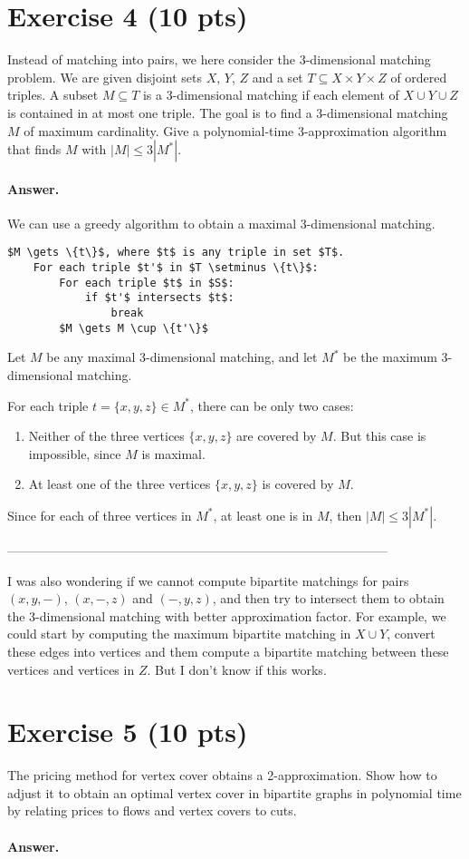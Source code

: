 \documentclass[a4paper]{article}
\begin{document}
\section*{Exercise 4 (10 pts)}

Instead of matching into pairs, we here consider the 3-dimensional matching problem. We are given disjoint sets $X$, $Y$, $Z$ and a set $T \subseteq X \times Y \times Z$ of ordered triples. A subset $M \subseteq T$ is a 3-dimensional matching if each element of $X \cup Y \cup Z$ is contained in at most one triple. The goal is to find a 3-dimensional matching $M$ of maximum cardinality. Give a polynomial-time 3-approximation algorithm that finds $M$ with $|M| \le 3|M^\ast|$.

\paragraph{Answer.}

We can use a greedy algorithm to obtain a maximal 3-dimensional matching.

\begin{lstlisting}[mathescape]
	$M \gets \{t\}$, where $t$ is any triple in set $T$.
	For each triple $t'$ in $T \setminus \{t\}$:
		For each triple $t$ in $S$:
			if $t'$ intersects $t$:
				break
		$M \gets M \cup \{t'\}$
\end{lstlisting}

Let $M$ be any maximal 3-dimensional matching, and let $M^\ast$ be the maximum 3-dimensional matching.

For each triple $t = \{x,y,z\} \in M^\ast$, there can be only two cases:
\begin{enumerate}
	\item Neither of the three vertices $\{x,y,z\}$ are covered by $M$. But this case is impossible, since $M$ is maximal.
	\item At least one of the three vertices $\{x,y,z\}$ is covered by $M$.
\end{enumerate}

Since for each of three vertices in $M^\ast$, at least one is in $M$, then $|M| \le 3|M^\ast|$.

------------------------------------------------------------------------------------------

I was also wondering if we cannot compute bipartite matchings for pairs $(x,y,-)$, $(x,-,z)$ and $(-,y,z)$, and then try to intersect them to obtain the 3-dimensional matching with better approximation factor. For example, we could start by computing the maximum bipartite matching in $X \cup Y$, convert these edges into vertices and them compute a bipartite matching between these vertices and vertices in $Z$. But I don't know if this works.

\section*{Exercise 5 (10 pts)}

The pricing method for vertex cover obtains a 2-approximation. Show how to adjust it to obtain an optimal vertex cover in bipartite graphs in polynomial time by relating prices to flows and vertex covers to cuts.

\paragraph{Answer.}
\end{document}
